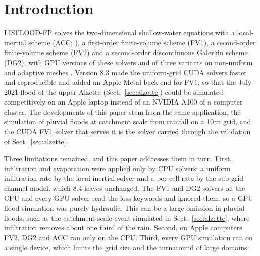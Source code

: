 \documentclass[preprint,12pt,authoryear]{elsarticle}
\begin{document}
\section{Introduction}\label{sec:intro}

LISFLOOD-FP solves the two-dimensional shallow-water equations with a
local-inertial scheme (ACC; \citealp{BATES201033}), a first-order
finite-volume scheme (FV1), a second-order finite-volume scheme (FV2) and a
second-order discontinuous Galerkin scheme (DG2), with GPU versions of these
solvers and of three variants on non-uniform and adaptive meshes
\citep{Shaw2021,Sharifian2023,Chowdhury2025,LISFLOODFP82zenodo}.
Version 8.3 made the uniform-grid CUDA solvers faster and reproducible and
added an Apple Metal back end for FV1, so that
the July 2021 flood of the upper Alzette (Sect.~\ref{sec:alzette}) could be
simulated competitively on an Apple laptop instead of an NVIDIA A100 of a computer cluster.
The developments of this paper stem from the same application, the
simulation of pluvial floods at catchment scale from rainfall on a 10\,m
grid, and the CUDA FV1 solver that serves it is the solver carried through
the validation of Sect.~\ref{sec:alzette}.

Three limitations remained, and this paper addresses them in turn. First,
infiltration and evaporation were applied only by CPU solvers: a uniform
infiltration rate by the local-inertial solver and a per-cell rate by the
sub-grid channel model, which 8.4 leaves unchanged. The FV1 and DG2
solvers on the CPU and every GPU solver read the loss keywords and ignored
them, so a GPU flood simulation was purely hydraulic. This can be a large
omission in pluvial floods, such as the catchment-scale event simulated in
Sect.~\ref{sec:alzette}, where infiltration removes about one third of the
rain.
Second, on Apple computers FV2, DG2 and ACC ran only on the CPU. Third,
every GPU simulation ran on a single device, which limits the grid size and
the turnaround of large domains.
\end{document}
